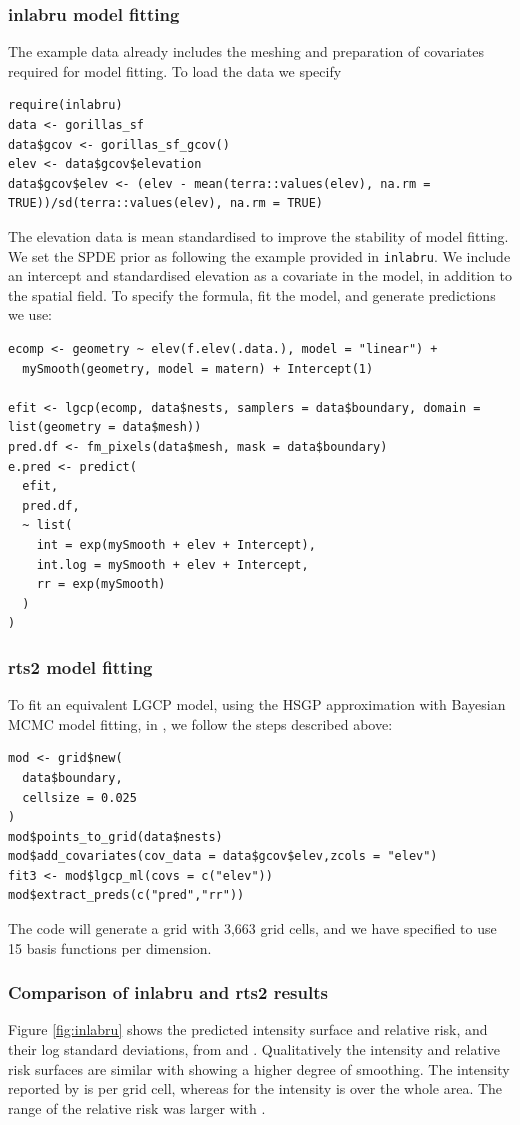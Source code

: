 \subsubsection{inlabru model fitting}
The example data already includes the meshing and preparation of covariates required for model fitting. To load the data we specify
\begin{lstlisting}
require(inlabru)
data <- gorillas_sf
data$gcov <- gorillas_sf_gcov()
elev <- data$gcov$elevation
data$gcov$elev <- (elev - mean(terra::values(elev), na.rm = TRUE))/sd(terra::values(elev), na.rm = TRUE)
\end{lstlisting}
The elevation data is mean standardised to improve the stability of model fitting. We set the SPDE prior as following the example provided in \texttt{inlabru}. We include an intercept and standardised elevation as a covariate in the model, in addition to the spatial field. To specify the formula, fit the model, and generate predictions we use:
\begin{lstlisting}
ecomp <- geometry ~ elev(f.elev(.data.), model = "linear") +
  mySmooth(geometry, model = matern) + Intercept(1)

efit <- lgcp(ecomp, data$nests, samplers = data$boundary, domain = list(geometry = data$mesh))
pred.df <- fm_pixels(data$mesh, mask = data$boundary)
e.pred <- predict(
  efit,
  pred.df,
  ~ list(
    int = exp(mySmooth + elev + Intercept),
    int.log = mySmooth + elev + Intercept,
    rr = exp(mySmooth)
  )
)
\end{lstlisting}

\subsubsection{rts2 model fitting}
To fit an equivalent LGCP model, using the HSGP approximation with Bayesian MCMC model fitting, in , we follow the steps described above:
\begin{lstlisting}
mod <- grid$new(
  data$boundary,
  cellsize = 0.025
)
mod$points_to_grid(data$nests)
mod$add_covariates(cov_data = data$gcov$elev,zcols = "elev")
fit3 <- mod$lgcp_ml(covs = c("elev"))
mod$extract_preds(c("pred","rr"))
\end{lstlisting}
The code will generate a grid with 3,663 grid cells, and we have specified to use 15 basis functions per dimension.

\subsubsection{Comparison of inlabru and rts2 results}
Figure \ref{fig:inlabru} shows the predicted intensity surface and relative risk, and their log standard deviations, from  and . Qualitatively the intensity and relative risk surfaces are similar with  showing a higher degree of smoothing. The intensity reported by  is per grid cell, whereas for  the intensity is over the whole area. The range of the relative risk was larger with . 

